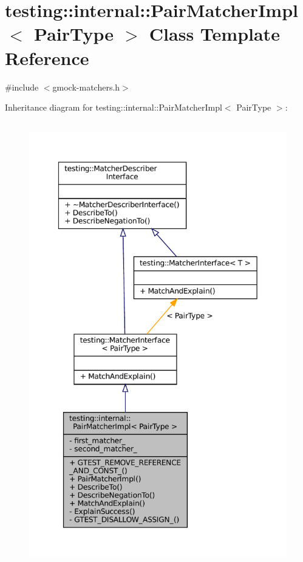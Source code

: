 \hypertarget{classtesting_1_1internal_1_1PairMatcherImpl}{}\section{testing\+:\+:internal\+:\+:Pair\+Matcher\+Impl$<$ Pair\+Type $>$ Class Template Reference}
\label{classtesting_1_1internal_1_1PairMatcherImpl}


{\ttfamily \#include $<$gmock-\/matchers.\+h$>$}



Inheritance diagram for testing\+:\+:internal\+:\+:Pair\+Matcher\+Impl$<$ Pair\+Type $>$\+:
\nopagebreak
\begin{figure}[H]
\begin{center}
\leavevmode
\includegraphics[height=550pt]{classtesting_1_1internal_1_1PairMatcherImpl__inherit__graph}
\end{center}
\end{figure}



